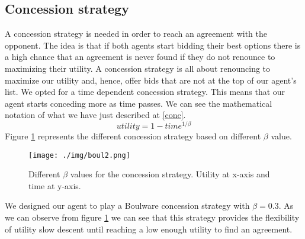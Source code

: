 \documentclass[runningheads]{llncs}
\begin{document}
\subsection{Concession strategy}\label{concession_strategy}
A concession strategy is needed in order to reach an agreement with
the opponent. The idea is that if both agents start bidding their best
options there is a high chance that an agreement is never found
if they do not renounce to maximizing their utility. A concession
strategy is all about renouncing to maximize our utility and, hence,
offer bids that are not at the top of our agent's list. We opted for a time dependent concession
strategy. This means that our agent starts conceding more as time
passes. We can see the mathematical notation of what we have just
described at \ref{conc}.
\begin{equation}\label{conc}
  utility = 1 - time^{1/\beta}
\end{equation}
Figure \ref{figconc} represents the different concession strategy based
on different $\beta$ value.
\begin{figure}
\texttt{[image: ./img/boul2.png]}
\caption{Different $\beta$ values for the concession strategy. Utility
at x-axis and time at y-axis.} \label{figconc}
\end{figure}
We designed our agent to play a Boulware concession strategy with
$\beta = 0.3$. As we can observe from figure \ref{figconc} we can see
that this strategy provides the flexibility of utility slow descent
until reaching a low enough utility to find an agreement. 
\end{document}
